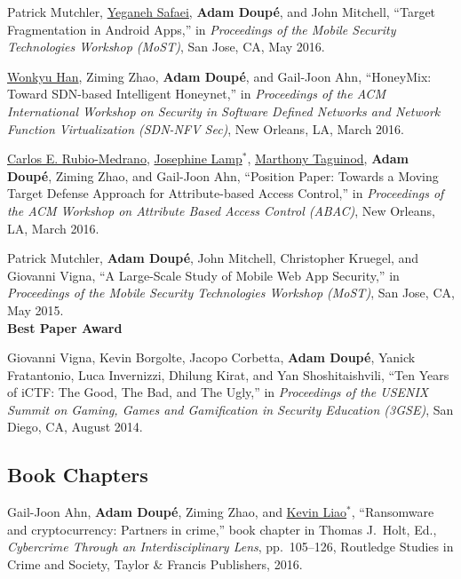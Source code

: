 \documentclass[11pt,letterpaper,sans]{moderncv}
\begin{document}
\begin{etaremune}
\item Patrick Mutchler, \underline{Yeganeh Safaei}, \textbf{Adam
  Doup\'e}, and John Mitchell, ``Target Fragmentation in Android
  Apps,'' in \emph{Proceedings of the Mobile Security Technologies
    Workshop (MoST)}, San Jose, CA, May 2016.

\item \underline{Wonkyu Han}, Ziming Zhao, \textbf{Adam Doup\'e}, and
  Gail-Joon Ahn, ``HoneyMix: Toward SDN-based Intelligent Honeynet,''
  in \emph{Proceedings of the ACM International Workshop on Security
    in Software Defined Networks and Network Function Virtualization
    (SDN-NFV Sec)}, New Orleans, LA, March 2016.

\item \underline{Carlos E. Rubio-Medrano}, \underline{Josephine
  Lamp}$^*$, \underline{Marthony Taguinod}, \textbf{Adam Doup\'e},
  Ziming Zhao, and Gail-Joon Ahn, ``Position Paper: Towards a Moving
  Target Defense Approach for Attribute-based Access Control,'' in
  \emph{Proceedings of the ACM Workshop on Attribute Based Access
    Control (ABAC)}, New Orleans, LA, March 2016.

\item Patrick Mutchler, \textbf{Adam Doup\'e}, John Mitchell,
  Christopher Kruegel, and Giovanni Vigna, ``A Large-Scale Study of
  Mobile Web App Security,'' in \emph{Proceedings of the Mobile
    Security Technologies Workshop (MoST)}, San Jose, CA, May 2015. \\
  \textbf{Best Paper Award}

\item Giovanni Vigna, Kevin Borgolte, Jacopo Corbetta, \textbf{Adam
  Doup\'e}, Yanick Fratantonio, Luca Invernizzi, Dhilung Kirat, and
  Yan Shoshitaishvili, ``Ten Years of iCTF: The Good, The Bad, and The
  Ugly,'' in \emph{Proceedings of the USENIX Summit on Gaming, Games
  and Gamification in Security Education (3GSE)}, San Diego, CA, August
  2014.

\end{etaremune}

\subsection{Book Chapters}

\begin{etaremune}

\item Gail-Joon Ahn, \textbf{Adam Doup\'e}, Ziming Zhao, and
  \underline{Kevin Liao}$^*$, ``Ransomware and cryptocurrency: Partners in
  crime,'' book chapter in Thomas J.\ Holt, Ed., \emph{Cybercrime
    Through an Interdisciplinary Lens}, pp.\ 105--126, Routledge
  Studies in Crime and Society, Taylor \& Francis Publishers, 2016.

\end{etaremune}
\end{document}
